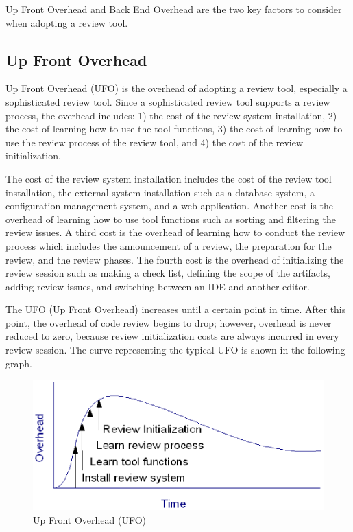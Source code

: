 Up Front Overhead and Back End Overhead are the two key factors to consider when adopting a review tool.

\subsection{Up Front Overhead}
\label{subsec:up-front-overhead}

Up Front Overhead (UFO) is the overhead of adopting a review tool, especially a sophisticated review tool. Since a sophisticated review tool supports a review process, the overhead includes: 1) the cost of the review system installation, 2) the cost of learning how to use the tool functions, 3) the cost of learning how to use the review process of the review tool, and 4) the cost of the review initialization.

The cost of the review system installation includes the cost of the review tool installation, the external system installation such as a database system, a configuration management system, and a web application. Another cost is the overhead of learning how to use tool functions such as sorting and filtering the review issues. A third cost is the overhead of learning how to conduct the review process which includes the announcement of a review, the preparation for the review, and the review phases. The fourth cost is the overhead of initializing the review session such as making a check list, defining the scope of the artifacts, adding review issues, and switching between an IDE and another editor.

The UFO (Up Front Overhead) increases until a certain point in time. After this point, the overhead of code review begins to drop; however, overhead is never reduced to zero, because review initialization costs are always incurred in every review session. The curve representing the typical UFO is shown in the following graph.

\begin{figure}[htbp]
  \centering
  \includegraphics{images/fig1-1.eps}
  \caption{Up Front Overhead (UFO)}
  \label{fig1-1}
\end{figure}

